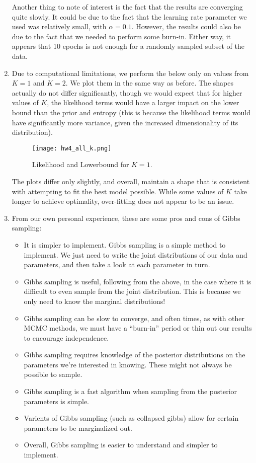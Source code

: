 \documentclass{harvardml}
\theoremstyle{plain}
\begin{document}
\begin{enumerate}
Another thing to note of interest is the fact that the results are converging quite slowly. It could be due to the fact that the learning rate parameter we used was relatively small, with $\alpha = 0.1$. However, the results could also be due to the fact that we needed to perform some burn-in. Either way, it appears that 10 epochs is not enough for a randomly sampled subset of the data.

\item Due to computational limitations, we perform the below only on values from $K =1$ and $K = 2$. We plot them in the same way as before. The shapes actually do not differ significantly, though we would expect that for higher values of $K$, the likelihood terms would have a larger impact on the lower bound than the prior and entropy (this is because the likelihood terms would have significantly more variance, given the increased dimensionality of its distribution).

\begin{figure}[h!]
\centering
\texttt{[image: hw4\_all\_k.png]}
\caption{Likelihood and Lowerbound for $K = 1$.}
\label{fig:bound_plot_1}
\end{figure}

The plots differ only slightly, and overall, maintain a shape that is consistent with attempting to fit the best model possible. While some values of $K$ take longer to achieve optimality, over-fitting does not appear to be an issue.

\item From our own personal experience, these are some pros and cons of Gibbs sampling:
\begin{itemize}
\item It is simpler to implement. Gibbs sampling is a simple method to implement. We just need to write the joint distributions of our data and parameters, and then take a look at each parameter in turn.
\item Gibbs sampling is useful, following from the above, in the case where it is difficult to even sample from the joint distribution. This is because we only need to know the marginal distributions!
\item Gibbs sampling can be slow to converge, and often times, as with other MCMC methods, we must have a ``burn-in'' period or thin out our results to encourage independence.
\item Gibbs sampling requires knowledge of the posterior distributions on the parameters we're interested in knowing. These might not always be possible to sample.
\item Gibbs sampling is a fast algorithm when sampling from the posterior parameters is simple.
\item Varients of Gibbs sampling (such as collapsed gibbs) allow for certain parameters to be marginalized out.
\item Overall, Gibbs sampling is easier to understand and simpler to implement.
\end{itemize}



\end{enumerate}
\end{document}
